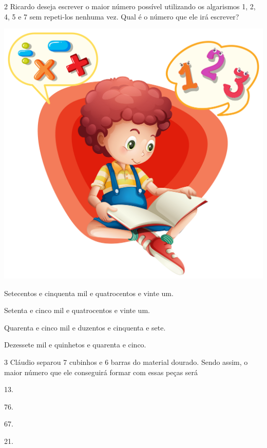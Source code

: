 \num{2} Ricardo deseja escrever o maior número possível utilizando os algarismos 1, 2, 4, 5 e 7 sem repeti-los nenhuma vez. Qual é o número que ele irá escrever?

\begin{minipage}{.5\textwidth}
\includegraphics[width=.8\textwidth]{./media/image107b.jpeg}
\end{minipage}
\begin{minipage}{.5\textwidth}
\begin{escolha}
\item
  Setecentos e cinquenta mil e quatrocentos e vinte um.
\item
  Setenta e cinco mil e quatrocentos e vinte um.
\item
  Quarenta e cinco mil e duzentos e cinquenta e sete.
\item
  Dezessete mil e quinhetos e quarenta e cinco.
\end{escolha}
\end{minipage}

\pagebreak
\num{3} Cláudio separou 7 cubinhos e 6 barras do material dourado. Sendo assim, o maior número que ele conseguirá formar com essas peças será

\begin{multicols}{2}
\begin{escolha}
\item
  13.
\item
  76.
\item
  67.
\item
  21.
\end{escolha}
\end{multicols}

